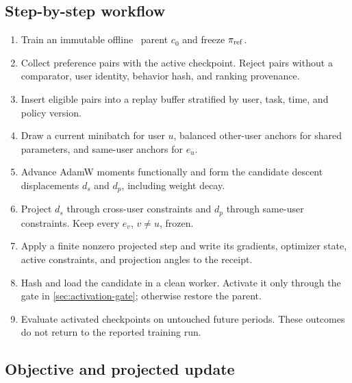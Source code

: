\subsection{Step-by-step workflow}

\begin{enumerate}
  \item Train an immutable offline \prlhf\ parent $c_0$ and freeze
  $\pi_{\mathrm{ref}}$.
  \item Collect preference pairs with the active checkpoint.  Reject pairs
  without a comparator, user identity, behavior hash, and ranking provenance.
  \item Insert eligible pairs into a replay buffer stratified by user, task,
  time, and policy version.
  \item Draw a current minibatch for user $u$, balanced other-user anchors for
  shared parameters, and same-user anchors for $e_u$.
  \item Advance AdamW moments functionally and form the candidate descent
  displacements $d_s$ and $d_p$, including weight decay.
  \item Project $d_s$ through cross-user constraints and $d_p$ through
  same-user constraints.  Keep every $e_v$, $v\ne u$, frozen.
  \item Apply a finite nonzero projected step and write its gradients,
  optimizer state, active constraints, and projection angles to the receipt.
  \item Hash and load the candidate in a clean worker.  Activate it only
  through the gate in \cref{sec:activation-gate}; otherwise restore the parent.
  \item Evaluate activated checkpoints on untouched future periods.  These
  outcomes do not return to the reported training run.
\end{enumerate}

\subsection{Objective and projected update}


